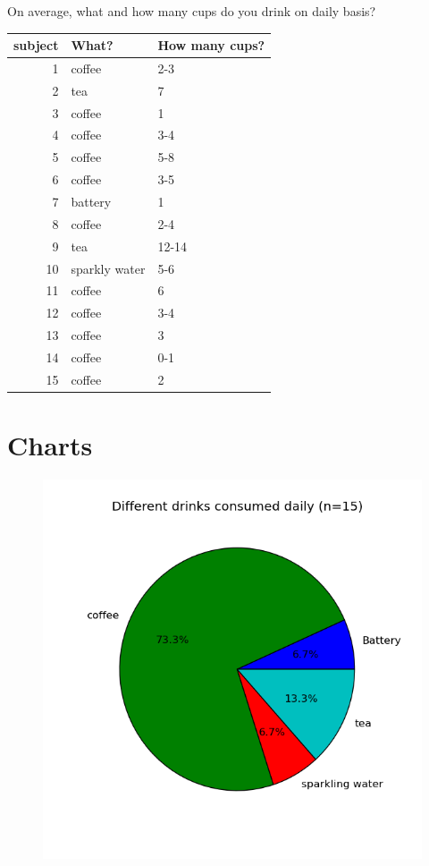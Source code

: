\documentclass[a4paper,12pt]{article}
\begin{document}
On average, what and how many cups do you drink on daily basis?\\

\begin{tabular}{|r|l|l|}
  \hline
  \textbf{subject} & \textbf{What?} & \textbf{How many cups?} \\
  \hline
  1 & coffee & 2-3 \\
  2 & tea & 7 \\
  3 & coffee & 1 \\
  4 & coffee & 3-4 \\
  5 & coffee & 5-8 \\
  6 & coffee & 3-5 \\
  7 & battery & 1 \\
  8 & coffee & 2-4 \\
  9 & tea & 12-14 \\
  10 & sparkly water & 5-6 \\
  11 & coffee & 6 \\
  12 & coffee & 3-4 \\
  13 & coffee & 3 \\
  14 & coffee & 0-1 \\
  15 & coffee & 2 \\
  \hline
\end{tabular}

\clearpage
\section{Charts}
\label{charts}

\begin{figure}[h]
  \includegraphics[width=\textwidth]{drinks.png}
\end{figure}
\end{document}
